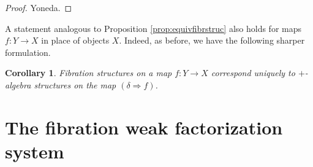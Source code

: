 \documentclass[11pt]{article}
\newtheorem{corollary}[theorem]{Corollary}
\theoremstyle{remark}
\theoremstyle{definition}
\begin{document}
\begin{proof}
Yoneda.
\end{proof}


A statement analogous to Proposition \ref{prop:equivfibrstruc} also holds for maps $f:Y\to X$ in place of objects $X$.  Indeed, as before, we have the following sharper formulation.

\begin{corollary}
Fibration structures on a map $f : Y\to X$ correspond uniquely to $+$-algebra structures on the map $(\delta\Rightarrow{f})$.
\end{corollary}

\section{The fibration weak factorization system}
\end{document}
